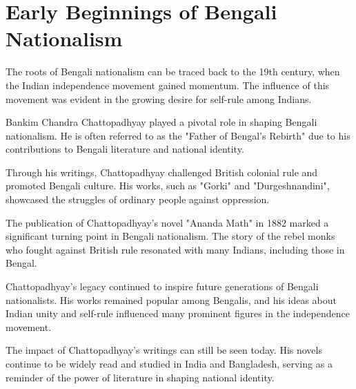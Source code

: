 \chapter{Early Beginnings of Bengali Nationalism}

The roots of Bengali nationalism can be traced back to the 19th century, when the Indian independence movement gained momentum. The influence of this movement was evident in the growing desire for self-rule among Indians.

Bankim Chandra Chattopadhyay played a pivotal role in shaping Bengali nationalism. He is often referred to as the "Father of Bengal's Rebirth" due to his contributions to Bengali literature and national identity.

Through his writings, Chattopadhyay challenged British colonial rule and promoted Bengali culture. His works, such as "Gorki" and "Durgeshnandini", showcased the struggles of ordinary people against oppression.

The publication of Chattopadhyay's novel "Ananda Math" in 1882 marked a significant turning point in Bengali nationalism. The story of the rebel monks who fought against British rule resonated with many Indians, including those in Bengal.

Chattopadhyay's legacy continued to inspire future generations of Bengali nationalists. His works remained popular among Bengalis, and his ideas about Indian unity and self-rule influenced many prominent figures in the independence movement.

The impact of Chattopadhyay's writings can still be seen today. His novels continue to be widely read and studied in India and Bangladesh, serving as a reminder of the power of literature in shaping national identity.